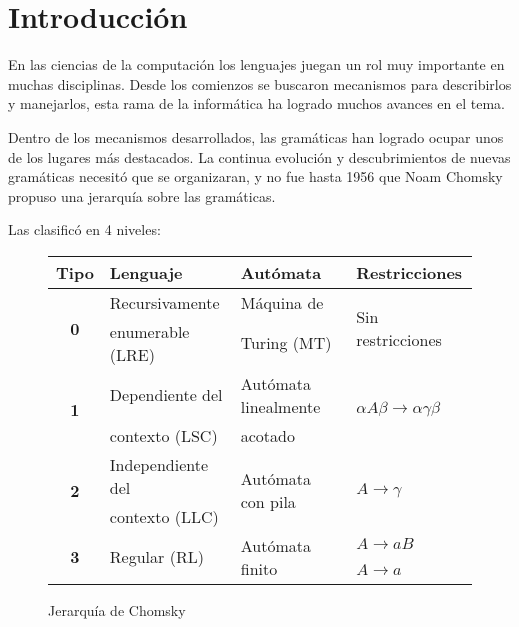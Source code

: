 \chapter{Introducci\'on}
\label{chap:intro}
\minitoc

En las ciencias de la computación los lenguajes juegan un rol muy importante en muchas disciplinas. Desde los comienzos se buscaron mecanismos para describirlos y manejarlos, esta rama de la informática ha logrado muchos avances en el tema.

Dentro de los mecanismos desarrollados, las gramáticas han logrado ocupar unos de los lugares más destacados. La continua evolución y descubrimientos de nuevas gramáticas necesitó que se organizaran, y no fue hasta 1956 que Noam Chomsky propuso una jerarquía sobre las gramáticas.

Las clasificó en 4 niveles:

\begin{figure}[h!]\centering 
\begin{tabular}{| c | p{3.5cm} | p{4cm} | p{3cm} |}
\hline

\rowcolor{gris} \textbf{Tipo} & \textbf{Lenguaje} & \textbf{Autómata} & \textbf{Restricciones} \\ \hline

\multirow{2}{*}{\textbf{0}} & Recursivamente   & Máquina de  & \multirow{2}{*}{Sin restricciones} \\ 
                            & enumerable (LRE) & Turing (MT) & \\ \hline

\multirow{2}{*}{\textbf{1}} & Dependiente del & Autómata linealmente & \multirow{2}{*}{$\alpha A \beta \rightarrow \alpha\gamma\beta$} \\ 
                            & contexto (LSC)  & acotado              & \\ \hline

\multirow{2}{*}{\textbf{2}} & Independiente del & \multirow{2}{*}{Autómata con pila} & \multirow{2}{*}{$A \rightarrow \gamma$} \\ 
                            & contexto (LLC)    &                   & \\ \hline

\multirow{2}{*}{\textbf{3}} & \multirow{2}{*}{Regular (RL)} & \multirow{2}{*}{Autómata finito} & $A \rightarrow aB$ \\ 
                            &              &                 & $A \rightarrow a$ \\ \hline
\end{tabular}\caption{\label{chomsky} Jerarquía de Chomsky}
\end{figure}

